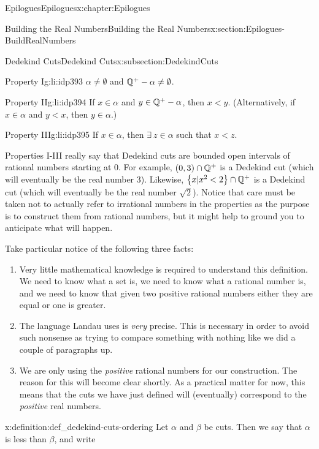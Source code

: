 \begin{chapterptx}{Epilogues}{}{Epilogues}{}{}{x:chapter:Epilogues}
\begin{sectionptx}{Building the Real Numbers}{}{Building the Real Numbers}{}{}{x:section:Epilogues-BuildRealNumbers}
\begin{subsectionptx}{Dedekind Cuts}{}{Dedekind Cuts}{}{}{x:subsection:DedekindCuts}
\begin{descriptionlist}
\begin{dlimedium}{Property I}{g:li:idp393}
					\(\alpha\ne\emptyset\) and \(\mathbb {Q}^+-\alpha\ne\emptyset\).%
				\end{dlimedium}%
				\begin{dlimedium}{Property II}{g:li:idp394}%
					If \(x\in\alpha\) and \(y\in\mathbb {Q}^+-\alpha\), then \(x\lt y\). (Alternatively, if \(x\in\alpha\) and \(y\lt x\), then \(y\in\alpha\).)%
				\end{dlimedium}%
				\begin{dlimedium}{Property III}{g:li:idp395}%
					If \(x\in\alpha\), then \(\exists\ z\in\alpha\) such that \(x\lt z\).%
				\end{dlimedium}%
			\end{descriptionlist}
			\par
			Properties I-III really say that Dedekind cuts are bounded open intervals of rational numbers starting at \(0\). For example, \((0,3)\cap\mathbb {Q}^+\) is a Dedekind cut (which will eventually be the real number \(3\)). Likewise, \(\left\{x|x^2< 2\right\}\cap\mathbb {Q}^+\) is a Dedekind cut (which will eventually be the real number \(\sqrt{2}\)). Notice that care must be taken not to actually refer to irrational numbers in the properties as the purpose is to construct them from rational numbers, but it might help to ground you to anticipate what will happen.%
			\par
			Take particular notice of the following three facts:%
			\begin{enumerate}
				\item{}Very little mathematical knowledge is required to understand this definition. We need to know what a set is, we need to know what a rational number is, and we need to know that given two positive rational numbers either they are equal or one is greater.%
				\item{}The language Landau uses is \emph{very} precise. This is necessary in order to avoid such nonsense as trying to compare something with nothing like we did a couple of paragraphs up.%
				\item{}We are only using the \emph{positive} rational numbers for our construction. The reason for this will become clear shortly. As a practical matter for now, this means that the cuts we have just defined will (eventually) correspond to the \emph{positive} real numbers.%
			\end{enumerate}
			\begin{definition}{}{x:definition:def_dedekind-cuts-ordering}%
				 Let \(\alpha\) and \(\beta\) be cuts. Then we say that \(\alpha\) is less than \(\beta\), and write%

\end{definition}
\end{subsectionptx}
\end{sectionptx}
\end{chapterptx}
